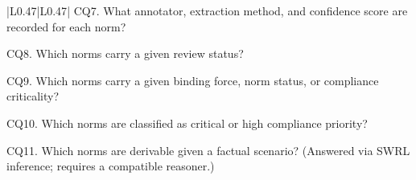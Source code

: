\documentclass[9pt,a4paper]{article}
\begin{document}
\begin{table}[t]
{\begin{tabular}{|L{0.47\linewidth}|L{0.47\linewidth}|}
CQ7. What annotator, extraction method, and confidence score are
recorded for each norm?

CQ8. Which norms carry a given review status?

CQ9. Which norms carry a given binding force, norm status, or
compliance criticality?

CQ10. Which norms are classified as critical or high compliance
priority?

CQ11. Which norms are derivable given a factual scenario?
(Answered via SWRL inference; requires a compatible reasoner.)\\
\hline

\end{tabular}%
}
\caption{NORMA-O Requirements Specification Document,
  following the LOT methodology template.
  \url{https://w3id.org/def/norma-o}.}
\label{tab:orsd}
\end{table}
\end{document}
